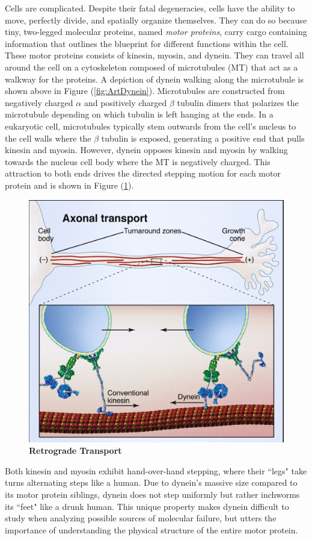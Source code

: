 Cells are complicated. Despite their fatal degeneracies, cells have the ability to move, perfectly divide, and spatially organize themselves. They can do so because tiny, two-legged molecular proteins, named \textit{motor proteins}, carry cargo containing information that outlines the blueprint for different functions within the cell. These motor proteins consists of kinesin, myosin, and dynein. They can travel all around the cell on a cytoskeleton composed of microtubules (MT) that act as a walkway for the proteins. A depiction of dynein walking along the microtubule is shown above in Figure (\ref{fig:ArtDynein}). Microtubules are constructed from negatively charged $\alpha$ and positively charged $\beta$ tubulin dimers that polarizes the microtubule depending on which tubulin is left hanging at the ends. In a eukaryotic cell, microtubules typically stem outwards from the cell's nucleus to the cell walls where the $\beta$ tubulin is exposed, generating a positive end that pulls kinesin and myosin. However, dynein opposes kinesin and myosin by walking towards the nucleus cell body where the MT is negatively charged. This attraction to both ends drives the directed stepping motion for each motor protein and is shown in Figure (\ref{fig:transport}). 

\begin{figure}[H]
	\centering
	\includegraphics[width=0.6\columnwidth]{Figures/retrograde_transport.jpg}
	\caption[Retrograde Transport]{\textbf{Retrograde Transport} \cite{Vale2003molecular}}
	\label{fig:transport}
\end{figure}

Both kinesin and myosin exhibit hand-over-hand stepping, where their ``legs" take turns alternating steps like a human. Due to dynein's massive size compared to its motor protein siblings, dynein does not step uniformly but rather inchworms its ``feet" like a drunk human. This unique property makes dynein difficult to study when analyzing possible sources of molecular failure, but utters the importance of understanding the physical structure of the entire motor protein.

